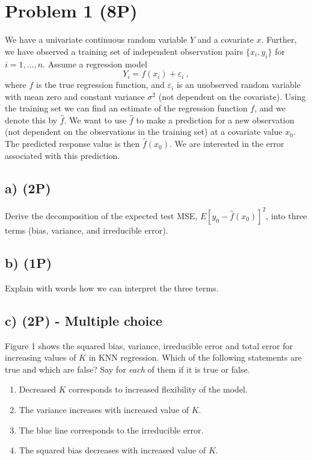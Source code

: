 \documentclass[
]{article}
\providecommand{\tightlist}{%
  \setlength{\itemsep}{0pt}\setlength{\parskip}{0pt}}
\begin{document}
\hypertarget{problem-1-8p}{%
\section{Problem 1 (8P)}\label{problem-1-8p}}

We have a univariate continuous random variable \(Y\) and a covariate
\(x\). Further, we have observed a training set of independent
observation pairs \(\{x_i, y_i\}\) for \(i=1,\ldots,n\). Assume a
regression model \[Y_i  = f(x_i) + \varepsilon_i \ ,\] where \(f\) is
the true regression function, and \(\varepsilon_i\) is an unobserved
random variable with mean zero and constant variance \(\sigma^2\) (not
dependent on the covariate). Using the training set we can find an
estimate of the regression function \(f\), and we denote this by
\(\hat{f}\). We want to use \(\hat{f}\) to make a prediction for a new
observation (not dependent on the observations in the training set) at a
covariate value \(x_0\). The predicted response value is then
\(\hat{f}(x_0)\). We are interested in the error associated with this
prediction.

\hypertarget{a-2p}{%
\subsection{a) (2P)}\label{a-2p}}

Derive the decomposition of the expected test MSE,
\(E[y_0 - \hat{f}(x_0)]^2\), into three terms (bias, variance, and
irreducible error).

\hypertarget{b-1p}{%
\subsection{b) (1P)}\label{b-1p}}

Explain with words how we can interpret the three terms.

\hypertarget{c-2p---multiple-choice}{%
\subsection{c) (2P) - Multiple choice}\label{c-2p---multiple-choice}}

Figure 1 shows the squared bias, variance, irreducible error and total
error for increasing values of \(K\) in KNN regression. Which of the
following statements are true and which are false? Say for \emph{each}
of them if it is true or false.

\begin{enumerate}
\def\labelenumi{(\roman{enumi})}
\tightlist
\item
  Decreased \(K\) corresponds to increased flexibility of the model.
\item
  The variance increases with increased value of \(K\).
\item
  The blue line corresponds to the irreducible error.
\item
  The squared bias decreases with increased value of \(K\).
\end{enumerate}
\end{document}
